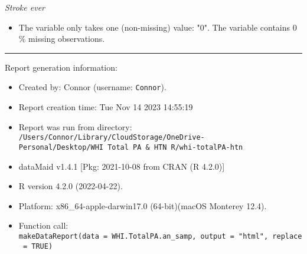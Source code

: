 \documentclass[
]{article}
\providecommand{\tightlist}{%
  \setlength{\itemsep}{0pt}\setlength{\parskip}{0pt}}
\begin{document}
\emph{Stroke ever}

\begin{itemize}
\tightlist
\item
  The variable only takes one (non-missing) value: "0". The variable
  contains 0 \% missing observations.
\end{itemize}

\begin{center}\rule{0.5\linewidth}{0.5pt}\end{center}

Report generation information:

\begin{itemize}
\item
  Created by: Connor (username: \texttt{Connor}).
\item
  Report creation time: Tue Nov 14 2023 14:55:19
\item
  Report was run from directory:
  \texttt{/Users/Connor/Library/CloudStorage/OneDrive-Personal/Desktop/WHI\ Total\ PA\ \&\ HTN\ R/whi-totalPA-htn}
\item
  dataMaid v1.4.1 {[}Pkg: 2021-10-08 from CRAN (R 4.2.0){]}
\item
  R version 4.2.0 (2022-04-22).
\item
  Platform: x86\_64-apple-darwin17.0 (64-bit)(macOS Monterey 12.4).
\item
  Function call:
  \texttt{makeDataReport(data\ =\ WHI.TotalPA.an\_samp,\ output\ =\ "html",\ replace\ =\ TRUE)}
\end{itemize}
\end{document}
